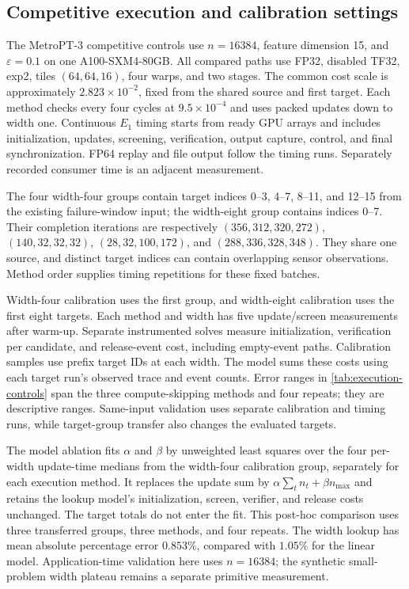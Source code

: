 \subsection{Competitive execution and calibration settings}
\label{sec:competitive-settings}

The MetroPT-3 competitive controls use $n=16384$, feature dimension 15, and $\varepsilon=0.1$ on one A100-SXM4-80GB. All compared paths use FP32, disabled TF32, exp2, tiles $(64,64,16)$, four warps, and two stages. The common cost scale is approximately $2.823\times10^{-2}$, fixed from the shared source and first target. Each method checks every four cycles at $9.5\times10^{-4}$ and uses packed updates down to width one. Continuous $E_1$ timing starts from ready GPU arrays and includes initialization, updates, screening, verification, output capture, control, and final synchronization. FP64 replay and file output follow the timing runs. Separately recorded consumer time is an adjacent measurement.

The four width-four groups contain target indices 0--3, 4--7, 8--11, and 12--15 from the existing failure-window input; the width-eight group contains indices 0--7. Their completion iterations are respectively $(356,312,320,272)$, $(140,32,32,32)$, $(28,32,100,172)$, and $(288,336,328,348)$. They share one source, and distinct target indices can contain overlapping sensor observations. Method order supplies timing repetitions for these fixed batches.

Width-four calibration uses the first group, and width-eight calibration uses the first eight targets. Each method and width has five update/screen measurements after warm-up. Separate instrumented solves measure initialization, verification per candidate, and release-event cost, including empty-event paths. Calibration samples use prefix target IDs at each width. The model sums these costs using each target run's observed trace and event counts. Error ranges in \cref{tab:execution-controls} span the three compute-skipping methods and four repeats; they are descriptive ranges. Same-input validation uses separate calibration and timing runs, while target-group transfer also changes the evaluated targets.

The model ablation fits $\alpha$ and $\beta$ by unweighted least squares over the four per-width update-time medians from the width-four calibration group, separately for each execution method. It replaces the update sum by $\alpha\sum_t n_t+\beta n_{\max}$ and retains the lookup model's initialization, screen, verifier, and release costs unchanged. The target totals do not enter the fit. This post-hoc comparison uses three transferred groups, three methods, and four repeats. The width lookup has mean absolute percentage error $0.853\%$, compared with $1.05\%$ for the linear model. Application-time validation here uses $n=16384$; the synthetic small-problem width plateau remains a separate primitive measurement.

